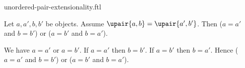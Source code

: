 \documentclass{article}
\begin{document}
\begin{smodule}[creators={Marcel Schütz}]{unordered-pair-extensionality.ftl}

  \begin{fproposition*}[label=6125259604361216]
    Let $a, a', b, b'$ be objects.
    Assume $\upair{a,b} = \upair{a',b'}$.
    Then ($a = a'$ and $b = b'$) or ($a = b'$ and $b = a'$).
  \end{fproposition*}
  \begin{fproof}
    We have $a = a'$ or $a = b'$.
    If $a = a'$ then $b = b'$.
    If $a = b'$ then $b = a'$.
    Hence ($a = a'$ and $b = b'$) or ($a = b'$ and $b = a'$).
  \end{fproof}
\end{smodule}
\end{document}
